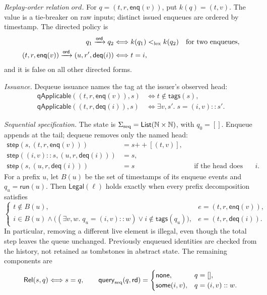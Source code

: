 \documentclass[11pt]{article}
\theoremstyle{definition}
\newcommand{\N}{\mathbb N}
\newcommand{\ord}{\mathrel{\xrightarrow{\mathsf{ord}}}}
\begin{document}
\emph{Replay-order relation $ord$.} For $q=(t,r,\mathsf{enq}(v))$, put $k(q)=(t,v)$.
The value is a tie-breaker on raw inputs; distinct issued enqueues are ordered
by timestamp. The directed policy is
\[
\begin{aligned}
 q_1\ord q_2&\Longleftrightarrow k(q_1)<_{\rm lex}k(q_2)
     &&\text{for two enqueues},\\
 (t,r,\mathsf{enq}(v))\ord(u,r',\mathsf{deq}(i))
   &\Longleftrightarrow t=i,
\end{aligned}
\]
and it is false on all other directed forms.

\emph{Issuance.} Dequeue issuance names the tag at
the issuer's observed head:
\[
\begin{aligned}
 \mathsf{qApplicable}((t,r,\mathsf{enq}(v)),s)
   &\Longleftrightarrow t\notin\mathsf{tags}(s),\\
 \mathsf{qApplicable}((t,r,\mathsf{deq}(i)),s)
   &\Longleftrightarrow \exists v,s'.\;s=(i,v)::s'.
\end{aligned}
\]

\emph{Sequential specification.} The state is
$\Sigma_{\rm seq}=\mathsf{List}(\N\times\N)$, with $q_0=[]$. Enqueue
appends at the tail; dequeue removes only the named head:
\[
\begin{aligned}
 \mathsf{step}(s,(t,r,\mathsf{enq}(v)))&=s\mathbin{+\!+}[(t,v)],\\
 \mathsf{step}((i,v)::s,(u,r,\mathsf{deq}(i)))&=s,\\
 \mathsf{step}(s,(u,r,\mathsf{deq}(i)))&=s
       &&\text{if the head does not have tag }i.
\end{aligned}
\]
For a prefix $u$, let $B(u)$ be the set of timestamps of its enqueue events
and $q_u=\mathsf{run}(u)$. Then $\mathsf{Legal}(\ell)$ holds exactly when
every prefix decomposition satisfies
\[
\begin{cases}
 t\notin B(u),&e=(t,r,\mathsf{enq}(v)),\\
 i\in B(u)\land
   \bigl((\exists v,w.\;q_u=(i,v)::w)\lor i\notin\mathsf{tags}(q_u)\bigr),
   &e=(t,r,\mathsf{deq}(i)).
\end{cases}
\]
In particular, removing a different live element is illegal, even though
the total step leaves the queue unchanged. Previously enqueued identities
are checked from the history, not retained as tombstones in abstract state.
The remaining components are
\[
 \mathsf{Rel}(s,q)\Longleftrightarrow s=q,\qquad
 \mathsf{query}_{\rm seq}(q,\mathsf{rd})=
 \begin{cases}\mathsf{none},&q=[],\\
 \mathsf{some}(i,v),&q=(i,v)::w.
 \end{cases}
\]
\end{document}
